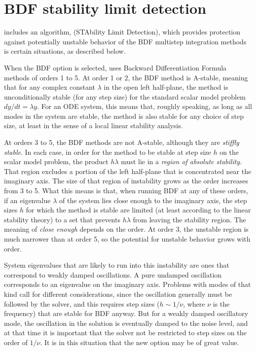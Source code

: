 \section{BDF stability limit detection}\label{s:bdf_stab}

{\cvode} includes an algorithm, {\stald} (STAbility Limit Detection),
which provides protection against potentially unstable behavior of the 
BDF multistep integration methods is certain situations, as described below.

When the BDF option is selected, {\cvode} uses Backward Differentiation 
Formula methods of orders 1 to 5.  At order 1 or 2, the BDF
method is A-stable, meaning that for any complex constant $\lambda$ in
the open left half-plane, the method is unconditionally stable (for
any step size) for the standard scalar model problem $dy/dt = \lambda y$.
For an ODE system, this means that, roughly speaking, as long as all
modes in the system are stable, the method is also stable for any
choice of step size, at least in the sense of a local linear stability
analysis.

At orders 3 to 5, the BDF methods are not A-stable, although they are
{\em stiffly stable}. In each case, in order for the method to be stable
at step size $h$ on the scalar model problem, the product $h\lambda$ must
lie in a {\em region of absolute stability}. 
That region excludes a portion of the left half-plane that is concentrated 
near the imaginary axis.  The size of that region of instability grows as the order
increases from 3 to 5.  What this means is that, when running BDF at
any of these orders, if an eigenvalue $\lambda$ of the system lies close
enough to the imaginary axis, the step sizes $h$ for which the method is
stable are limited (at least according to the linear stability theory)
to a set that prevents $h\lambda$ from leaving the stability region.
The meaning of {\em close enough} depends on the order.  
At order 3, the unstable region is much narrower than at order 5, 
so the potential for unstable behavior grows with order.

System eigenvalues that are likely to run into this instability are
ones that correspond to weakly damped oscillations.  A pure undamped
oscillation corresponds to an eigenvalue on the imaginary axis.
Problems with modes of that kind call for different considerations,
since the oscillation generally must be followed by the solver, and
this requires step sizes ($h \sim 1/\nu$, where $\nu$ is the frequency) 
that are stable for BDF anyway.  But for a weakly damped oscillatory mode,
the oscillation in the solution is eventually damped to the noise level, 
and at that time it is important that the solver not be restricted to step 
sizes on the order of $1/\nu$.  It is in this situation that the new option may
be of great value.

